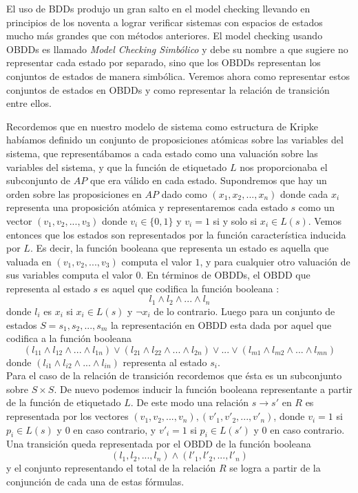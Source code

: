 \documentclass[pdftex,a4paper,12pt]{book}
\begin{document}
El uso de BDDs produjo un gran salto en el model checking llevando en principios de los noventa a lograr verificar sistemas con espacios de estados mucho m\'as grandes que con m\'etodos anteriores. El model checking usando OBDDs es llamado \textit{Model Checking Simb\'olico} y debe su nombre a que sugiere no representar cada estado por separado, sino que los OBDDs representan los conjuntos de estados de manera simb\'olica. Veremos ahora como representar estos conjuntos de estados en OBDDs y como representar la relaci\'on de transici\'on entre ellos.

Recordemos que en nuestro modelo de sistema como estructura de Kripke hab\'iamos definido un conjunto de proposiciones at\'omicas sobre las variables del sistema, que represent\'abamos a cada estado como una valuaci\'on sobre las variables del sistema, y que la funci\'on de etiquetado $L$ nos proporcionaba el subconjunto de $AP$ que era v\'alido en cada estado. Supondremos que hay un orden sobre las proposiciones en $AP$ dado como $(x_1,x_2,...,x_n)$ donde cada $x_i$ representa una proposici\'on at\'omica y representaremos cada estado $s$ como un vector $(v_1,v_2,...,v_3)$ donde $v_i \in \lbrace 0,1 \rbrace$ y $v_i = 1$ si y solo si $x_i \in L(s)$. Vemos entonces que los estados son representados por la funci\'on caracter\'istica inducida por $L$. Es decir, la funci\'on booleana que representa un estado es aquella que valuada en $(v_1,v_2,...,v_3)$ computa el valor $1$, y para cualquier otro valuaci\'on de sus variables computa el valor $0$. En t\'erminos de OBDDs, el OBDD que representa al estado $s$ es aquel que codifica la funci\'on booleana : $$l_1 \wedge l_2 \wedge ... \wedge l_n$$ donde $l_i$ es $x_i$ si $x_i \in L(s)$ y $\neg x_i$ de lo contrario. Luego para un conjunto de estados $S = {s_1, s_2, ..., s_m}$ la representaci\'on en OBDD esta dada por aquel que codifica a la funci\'on booleana $$(l_{11} \wedge l_{12} \wedge ... \wedge l_{1n}) \vee (l_{21} \wedge l_{22} \wedge ... \wedge l_{2n}) \vee ... \vee (l_{m1} \wedge l_{m2} \wedge ... \wedge l_{mn})$$ donde $(l_{i1} \wedge l_{i2} \wedge ... \wedge l_{in})$ representa al estado $s_i$.\\

Para el caso de la relaci\'on de transici\'on recordemos que \'esta es un subconjunto sobre $S\times S$. De nuevo podemos inducir la funci\'on booleana representante a partir de la funci\'on de etiquetado $L$. De este modo una relaci\'on $s\rightarrow s'$ en $R$ es representada por los vectores $(v_1,v_2,...,v_n),(v'_1,v'_2,...,v'_n)$, donde $v_i = 1$ si $p_i \in L(s)$ y $0$ en caso contrario, y $v'_i = 1$ si $p_i \in L(s')$ y $0$ en caso contrario. Una transici\'on queda representada por el OBDD de la funci\'on booleana $$(l_1,l_2,...,l_n) \wedge (l'_1,l'_2,...,l'_n)$$ y el conjunto representando el total de la relaci\'on $R$ se logra a partir de la conjunci\'on de cada una de estas f\'ormulas.
\end{document}
